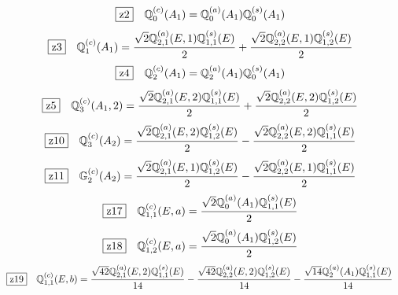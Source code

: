 \documentclass[fleqn,10pt,landscape]{jsarticle}
\begin{document}
\begin{dmath*}
\hspace*{3mm}\fbox{z2}\quad \mathbb{Q}_{0}^{(c)}(A_{1})=\mathbb{Q}_{0}^{(a)}(A_{1}) \mathbb{Q}_{0}^{(s)}(A_{1})
\end{dmath*}
\begin{dmath*}
\hspace*{3mm}\fbox{z3}\quad \mathbb{Q}_{1}^{(c)}(A_{1})=\frac{\sqrt{2} \mathbb{Q}_{2,1}^{(a)}(E,1) \mathbb{Q}_{1,1}^{(s)}(E)}{2} + \frac{\sqrt{2} \mathbb{Q}_{2,2}^{(a)}(E,1) \mathbb{Q}_{1,2}^{(s)}(E)}{2}
\end{dmath*}
\begin{dmath*}
\hspace*{3mm}\fbox{z4}\quad \mathbb{Q}_{2}^{(c)}(A_{1})=\mathbb{Q}_{2}^{(a)}(A_{1}) \mathbb{Q}_{0}^{(s)}(A_{1})
\end{dmath*}
\begin{dmath*}
\hspace*{3mm}\fbox{z5}\quad \mathbb{Q}_{3}^{(c)}(A_{1},2)=\frac{\sqrt{2} \mathbb{Q}_{2,1}^{(a)}(E,2) \mathbb{Q}_{1,1}^{(s)}(E)}{2} + \frac{\sqrt{2} \mathbb{Q}_{2,2}^{(a)}(E,2) \mathbb{Q}_{1,2}^{(s)}(E)}{2}
\end{dmath*}
\begin{dmath*}
\hspace*{3mm}\fbox{z10}\quad \mathbb{Q}_{3}^{(c)}(A_{2})=\frac{\sqrt{2} \mathbb{Q}_{2,1}^{(a)}(E,2) \mathbb{Q}_{1,2}^{(s)}(E)}{2} - \frac{\sqrt{2} \mathbb{Q}_{2,2}^{(a)}(E,2) \mathbb{Q}_{1,1}^{(s)}(E)}{2}
\end{dmath*}
\begin{dmath*}
\hspace*{3mm}\fbox{z11}\quad \mathbb{G}_{2}^{(c)}(A_{2})=\frac{\sqrt{2} \mathbb{Q}_{2,1}^{(a)}(E,1) \mathbb{Q}_{1,2}^{(s)}(E)}{2} - \frac{\sqrt{2} \mathbb{Q}_{2,2}^{(a)}(E,1) \mathbb{Q}_{1,1}^{(s)}(E)}{2}
\end{dmath*}
\begin{dmath*}
\hspace*{3mm}\fbox{z17}\quad \mathbb{Q}_{1,1}^{(c)}(E,a)=\frac{\sqrt{2} \mathbb{Q}_{0}^{(a)}(A_{1}) \mathbb{Q}_{1,1}^{(s)}(E)}{2}
\end{dmath*}
\begin{dmath*}
\hspace*{3mm}\fbox{z18}\quad \mathbb{Q}_{1,2}^{(c)}(E,a)=\frac{\sqrt{2} \mathbb{Q}_{0}^{(a)}(A_{1}) \mathbb{Q}_{1,2}^{(s)}(E)}{2}
\end{dmath*}
\begin{dmath*}
\hspace*{3mm}\fbox{z19}\quad \mathbb{Q}_{1,1}^{(c)}(E,b)=\frac{\sqrt{42} \mathbb{Q}_{2,1}^{(a)}(E,2) \mathbb{Q}_{1,1}^{(s)}(E)}{14} - \frac{\sqrt{42} \mathbb{Q}_{2,2}^{(a)}(E,2) \mathbb{Q}_{1,2}^{(s)}(E)}{14} - \frac{\sqrt{14} \mathbb{Q}_{2}^{(a)}(A_{1}) \mathbb{Q}_{1,1}^{(s)}(E)}{14}
\end{dmath*}
\end{document}
